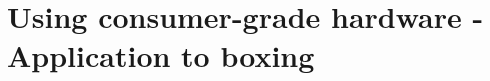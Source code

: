 
\lhead[\fancyplain{}{\leftmark}]%
      {\fancyplain{}{}} %
\chead[\fancyplain{}{}]%
      {\fancyplain{}{}}
\rhead[\fancyplain{}{}]%
      {\fancyplain{}{\rightmark}}%
\lfoot[\fancyplain{}{}]%
      {\fancyplain{}{}}
\cfoot[\fancyplain{}{\thepage}]%
      {\fancyplain{}{\thepage}} %
\rfoot[\fancyplain{}{}]%
     {\fancyplain{}{\scriptsize}}



\chapter{Using consumer-grade hardware - Application to boxing}
\label{ch:6}





